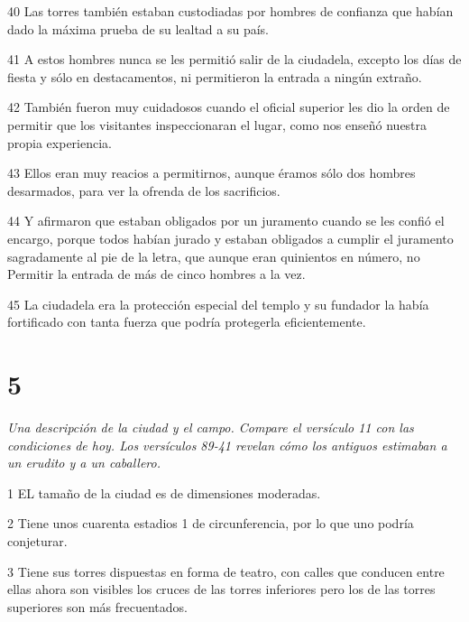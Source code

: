 \par 40 Las torres también estaban custodiadas por hombres de confianza que habían dado la máxima prueba de su lealtad a su país.

\par 41 A estos hombres nunca se les permitió salir de la ciudadela, excepto los días de fiesta y sólo en destacamentos, ni permitieron la entrada a ningún extraño.

\par 42 También fueron muy cuidadosos cuando el oficial superior les dio la orden de permitir que los visitantes inspeccionaran el lugar, como nos enseñó nuestra propia experiencia.

\par 43 Ellos eran muy reacios a permitirnos, aunque éramos sólo dos hombres desarmados, para ver la ofrenda de los sacrificios.

\par 44 Y afirmaron que estaban obligados por un juramento cuando se les confió el encargo, porque todos habían jurado y estaban obligados a cumplir el juramento sagradamente al pie de la letra, que aunque eran quinientos en número, no Permitir la entrada de más de cinco hombres a la vez.

\par 45 La ciudadela era la protección especial del templo y su fundador la había fortificado con tanta fuerza que podría protegerla eficientemente.

\chapter{5}

\par \textit{Una descripción de la ciudad y el campo. Compare el versículo 11 con las condiciones de hoy. Los versículos 89-41 revelan cómo los antiguos estimaban a un erudito y a un caballero.}

\par 1 EL tamaño de la ciudad es de dimensiones moderadas.

\par 2 Tiene unos cuarenta estadios 1 de circunferencia, por lo que uno podría conjeturar.

\par 3 Tiene sus torres dispuestas en forma de teatro, con calles que conducen entre ellas ahora son visibles los cruces de las torres inferiores pero los de las torres superiores son más frecuentados.

